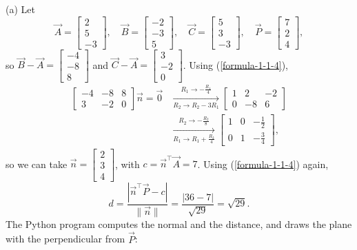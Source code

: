 \begin{enumerate}[label={},font=\normalfont,leftmargin=1.15cm,labelwidth=1.0cm,labelsep=0.15cm,itemindent=0pt,listparindent=0pt,itemsep=\baselineskip,parsep=0pt,topsep=0pt]
(a) Let
\[
\vec{A}=\begin{bmatrix}2\\5\\-3\end{bmatrix},\quad\vec{B}=\begin{bmatrix}-2\\-3\\5\end{bmatrix},\quad\vec{C}=\begin{bmatrix}5\\3\\-3\end{bmatrix},\quad\vec{P}=\begin{bmatrix}7\\2\\4\end{bmatrix},
\]
so $\vec{B}-\vec{A}=\begin{bmatrix}-4\\-8\\8\end{bmatrix}$ and $\vec{C}-\vec{A}=\begin{bmatrix}3\\-2\\0\end{bmatrix}$. Using (\ref{formula-1-1-4}),
\[
\begin{aligned}
\begin{bmatrix}-4&-8&8\\3&-2&0\end{bmatrix}\vec{n}=\vec{0}
&\xrightarrow[R_2\to R_2-3R_1]{R_1\to-\frac{R_1}{4}}
\begin{bmatrix}1&2&-2\\0&-8&6\end{bmatrix}\\
&\xrightarrow[R_1\to R_1+\frac{R_2}{4}]{R_2\to-\frac{R_2}{8}}
\begin{bmatrix}1&0&-\frac{1}{2}\\0&1&-\frac{3}{4}\end{bmatrix},
\end{aligned}
\]
so we can take $\vec{n}=\begin{bmatrix}2\\3\\4\end{bmatrix}$, with $c=\vec{n}^{\top}\vec{A}=7$. Using (\ref{formula-1-1-4}) again,
\[
d=\frac{|\vec{n}^{\top}\vec{P}-c|}{\|\vec{n}\|}=\frac{|36-7|}{\sqrt{29}}=\boxed{\sqrt{29}}.
\]
The Python program computes the normal and the distance, and draws the plane with the perpendicular from $\vec{P}$:

\end{enumerate}
